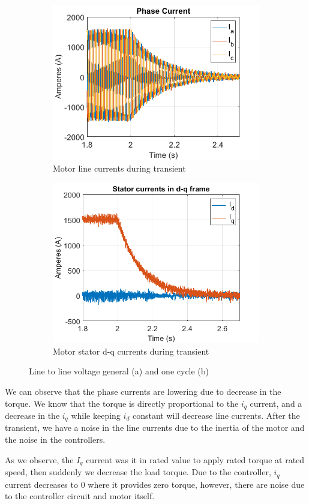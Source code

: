        \begin{figure}[H]
        \centering
        \begin{subfigure}[b]{0.475\textwidth}
              \centering
        \includegraphics[width = 8 cm]{figs/TL0_phase.png}
        \caption{Motor line currents during transient}
        \label{fig:tl0_p}
        \end{subfigure}
        \hfill
        \begin{subfigure}[b]{0.475\textwidth}  
            \centering
        \includegraphics[width = 8 cm]{figs/TL0_dq.png}
        \caption{Motor stator d-q currents during transient}
        \label{fig:tl0_dq}
        \end{subfigure}
        \caption{Line to line voltage general (a) and one cycle (b)}
        \label{fig:3phase_c}
        \end{figure}
        
We can observe that the phase currents are lowering due to decrease in the torque. We know that the torque is directly proportional to the $i_q$ current, and a decrease in the $i_q$ while keeping $i_d$ constant will decrease line currents. After the transient, we have a noise in the line currents due to the inertia of the motor and the noise in the controllers.
        
As we observe, the $I_q$ current was it in rated value to apply rated torque at rated speed, then suddenly we decrease the load torque. Due to the controller, $i_q$ current decreases to $0$ where it provides zero torque, however, there are noise due to the controller circuit and motor itself.

